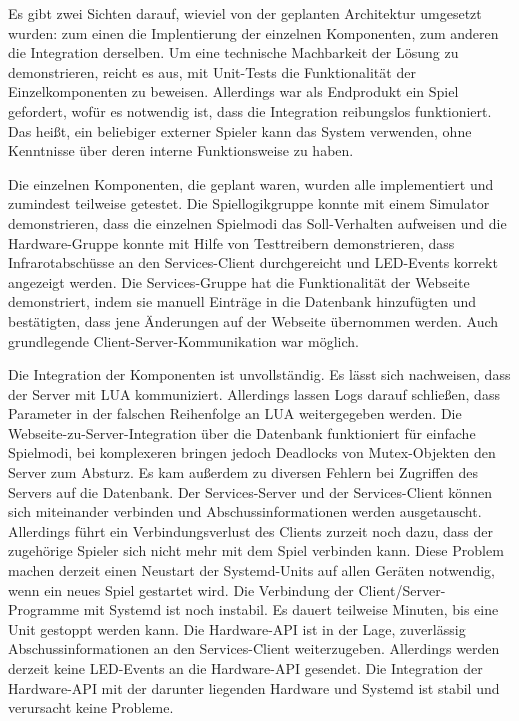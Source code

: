 Es gibt zwei Sichten darauf, wieviel von der geplanten Architektur umgesetzt wurden: zum einen die
Implentierung der einzelnen Komponenten, zum anderen die Integration derselben.
Um eine technische Machbarkeit der Lösung zu demonstrieren, reicht es aus, mit Unit-Tests die
Funktionalität der Einzelkomponenten zu beweisen.
Allerdings war als Endprodukt ein Spiel gefordert, wofür es notwendig ist, dass die Integration
reibungslos funktioniert.
Das heißt, ein beliebiger externer Spieler kann das System verwenden, ohne Kenntnisse über deren
interne Funktionsweise zu haben.

Die einzelnen Komponenten, die geplant waren, wurden alle implementiert und zumindest teilweise
getestet.
Die Spiellogikgruppe konnte mit einem Simulator demonstrieren, dass die einzelnen Spielmodi das
Soll-Verhalten aufweisen und die Hardware-Gruppe konnte mit Hilfe von Testtreibern demonstrieren,
dass Infrarotabschüsse an den Services-Client durchgereicht und LED-Events korrekt angezeigt werden.
Die Services-Gruppe hat die Funktionalität der Webseite demonstriert, indem sie manuell Einträge in
die Datenbank hinzufügten und bestätigten, dass jene Änderungen auf der Webseite übernommen werden.
Auch grundlegende Client-Server-Kommunikation war möglich.

Die Integration der Komponenten ist unvollständig.
Es lässt sich nachweisen, dass der Server mit LUA kommuniziert.
Allerdings lassen Logs darauf schließen, dass Parameter in der falschen Reihenfolge an LUA
weitergegeben werden.
Die Webseite-zu-Server-Integration über die Datenbank funktioniert für einfache Spielmodi, bei
komplexeren bringen jedoch Deadlocks von Mutex-Objekten den Server zum Absturz.
Es kam außerdem zu diversen Fehlern bei Zugriffen des Servers auf die Datenbank.
Der Services-Server und der Services-Client können sich miteinander verbinden und
Abschussinformationen werden ausgetauscht.
Allerdings führt ein Verbindungsverlust des Clients zurzeit noch dazu, dass der zugehörige Spieler
sich nicht mehr mit dem Spiel verbinden kann.
Diese Problem machen derzeit einen Neustart der Systemd-Units auf allen Geräten notwendig, wenn ein
neues Spiel gestartet wird.
Die Verbindung der Client/Server-Programme mit Systemd ist noch instabil.
Es dauert teilweise Minuten, bis eine Unit gestoppt werden kann.
Die Hardware-API ist in der Lage, zuverlässig Abschussinformationen an den Services-Client
weiterzugeben.
Allerdings werden derzeit keine LED-Events an die Hardware-API gesendet.
Die Integration der Hardware-API mit der darunter liegenden Hardware und Systemd ist stabil und
verursacht keine Probleme.
